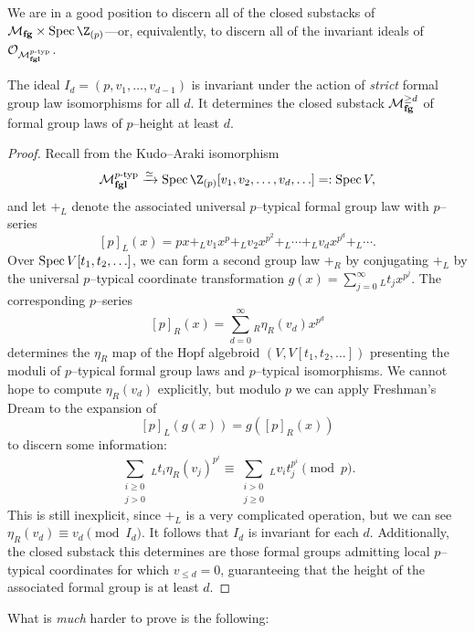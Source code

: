 We are in a good position to discern all of the closed substacks of $\moduli{fg} \times \Spec \Z_{(p)}$---or, equivalently, to discern all of the invariant ideals of $\mathcal{O}_{\mathcal{M}_{\mathbf{fgl}}^{p\text{-}\mathrm{typ}}}$.

\begin{corollary}\label{IdIsAnInvariantIdeal}
The ideal $I_d = (p, v_1, \ldots, v_{d-1})$ is invariant under the action of \emph{strict} formal group law isomorphisms for all $d$.  It determines the closed substack $\mathcal{M}_{\mathbf{fg}}^{\ge d}$ of formal group laws of $p$--height at least $d$.
\end{corollary}
\begin{proof}
Recall from  the Kudo--Araki isomorphism \[\moduli{fgl}^{\ptyp} \xrightarrow{\simeq} \Spec \Z_{(p)}[v_1, v_2, \ldots, v_d, \ldots] =: \Spec V,\] and let $+_L$ denote the associated universal $p$--typical formal group law with $p$--series \[[p]_L(x) = px +_L v_1 x^p +_L v_2 x^{p^2} +_L \cdots +_L v_d x^{p^d} +_L \cdots.\]  Over $\operatorname{Spec} V[t_1, t_2, \ldots]$, we can form a second group law $+_R$ by conjugating $+_L$ by the universal $p$--typical coordinate transformation $g(x) = \sum_{j=0}^\infty {}_L t_j x^{p^j}$.  The corresponding $p$--series \[[p]_R(x) = \sum_{d=0}^\infty {}_R \eta_R(v_d) x^{p^d}\] determines the $\eta_R$ map of the Hopf algebroid $(V, V[t_1, t_2, \ldots])$ presenting the moduli of $p$--typical formal group laws and $p$--typical isomorphisms.  We cannot hope to compute $\eta_R(v_d)$ explicitly, but modulo $p$ we can apply Freshman's Dream to the expansion of \[[p]_L(g(x)) = g([p]_R(x))\] to discern some information: \[\sum_{\substack{i \ge 0 \\ j > 0}}{}_L t_i \eta_R(v_j)^{p^i} \equiv \sum_{\substack{i > 0 \\ j \ge 0}}{}_L v_i t_j^{p^i} \pmod p.\]  This is still inexplicit, since $+_L$ is a very complicated operation, but we can see $\eta_R(v_d) \equiv v_d \pmod{I_d}$.  It follows that $I_d$ is invariant for each $d$.  Additionally, the closed substack this determines are those formal groups admitting local $p$--typical coordinates for which $v_{\le d} = 0$, guaranteeing that the height of the associated formal group is at least $d$.
\end{proof}

\noindent What is \emph{much} harder to prove is the following:

